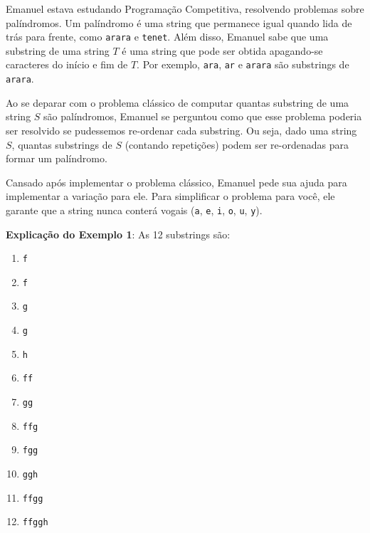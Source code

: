 %

Emanuel estava estudando Programação Competitiva, resolvendo problemas sobre palíndromos. Um palíndromo é uma string que permanece igual quando lida de trás para frente, como {\tt arara} e {\tt tenet}. Além disso, Emanuel sabe que uma substring de uma string $T$ é uma string que pode ser obtida apagando-se caracteres do início e fim de $T$. Por exemplo, {\tt ara}, {\tt ar} e {\tt arara} são substrings de {\tt arara}.

Ao se deparar com o problema clássico de computar quantas substring de uma string $S$ são palíndromos, Emanuel se perguntou como que esse problema poderia ser resolvido se pudessemos re-ordenar cada substring. Ou seja, dado uma string $S$, quantas substrings de $S$ (contando repetições) podem ser re-ordenadas para formar um palíndromo.

Cansado após implementar o problema clássico, Emanuel pede sua ajuda para implementar a variação para ele. Para simplificar o problema para você, ele garante que a string nunca conterá vogais ({\tt a}, {\tt e}, {\tt i}, {\tt o}, {\tt u}, {\tt y}).

%
%

%
%



\sampleio

\bigskip
\textbf{Explicação do Exemplo 1}: As 12 substrings são:

\begin{multicols}{2}
\begin{enumerate}
	\item {\tt f}
	\item {\tt f}
	\item {\tt g}
	\item {\tt g}
	\item {\tt h}
	\item {\tt ff}
	\item {\tt gg}
	\item {\tt ffg}
	\item {\tt fgg}
	\item {\tt ggh}
	\item {\tt ffgg}
	\item {\tt ffggh}
\end{enumerate}
\end{multicols}

